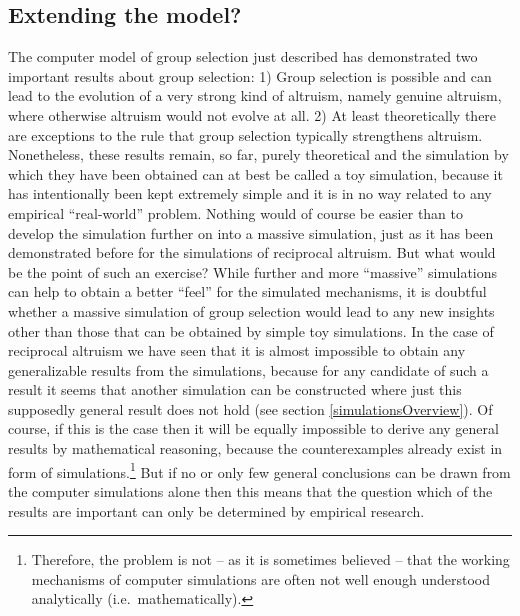 \subsection{Extending the model?}

The computer model of group selection just described has demonstrated two
important results about group selection: 1) Group selection is possible and
can lead to the evolution of a very strong kind of altruism, namely genuine
altruism, where otherwise altruism would not evolve at all. 2) At least
theoretically there are exceptions to the rule that group selection typically
strengthens altruism. Nonetheless, these results remain, so far, purely
theoretical and the simulation by which they have been obtained can at best be
called a toy simulation, because it has intentionally been kept extremely
simple and it is
in no way related to any empirical ``real-world'' problem. Nothing would of
course be easier than to develop the simulation further on into a massive
simulation, just as it has been demonstrated before for the
simulations of reciprocal altruism. But what would be the point of such an
exercise? While further and more ``massive'' simulations can help to obtain a
better ``feel'' for the simulated mechanisms, it is doubtful whether a massive
simulation of group selection would lead to any new insights other than those
that can be obtained by simple toy simulations. In the case of reciprocal
altruism we have seen that it is almost impossible to obtain any
generalizable results from the simulations, because for any candidate of such
a result it seems that another simulation can be constructed where just this
supposedly general result does not hold (see section
\ref{simulationsOverview}). Of course, if this is the case then it will be
equally impossible to derive any general results by mathematical reasoning,
because the counterexamples already exist in form of
simulations.\footnote{Therefore, the problem is not -- as it is sometimes
  believed -- that the working mechanisms of computer simulations are often
  not well enough understood analytically (i.e.\ mathematically).} But if no
or only few general conclusions can be drawn from the computer simulations
alone then this means that the question which of the results are important can
only be determined by empirical research.

